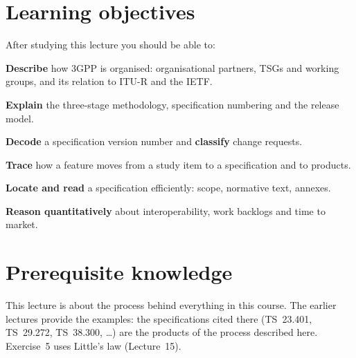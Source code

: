 \documentclass[11pt,a4paper]{article}
\begin{document}
\ACNcover

\section{Learning objectives}
After studying this lecture you should be able to:
\begin{objectives}
  \item \textbf{Describe} how 3GPP is organised: organisational partners, TSGs and working groups, and its
        relation to ITU-R and the IETF.
  \item \textbf{Explain} the three-stage methodology, specification numbering and the release model.
  \item \textbf{Decode} a specification version number and \textbf{classify} change requests.
  \item \textbf{Trace} how a feature moves from a study item to a specification and to products.
  \item \textbf{Locate and read} a specification efficiently: scope, normative text, annexes.
  \item \textbf{Reason quantitatively} about interoperability, work backlogs and time to market.
\end{objectives}

\section{Prerequisite knowledge}
This lecture is about the process behind everything in this course. The earlier lectures provide the
examples: the specifications cited there (TS~23.401, TS~29.272, TS~38.300, \ldots) are the products of the
process described here. Exercise~5 uses Little's law (Lecture~15).
\end{document}
